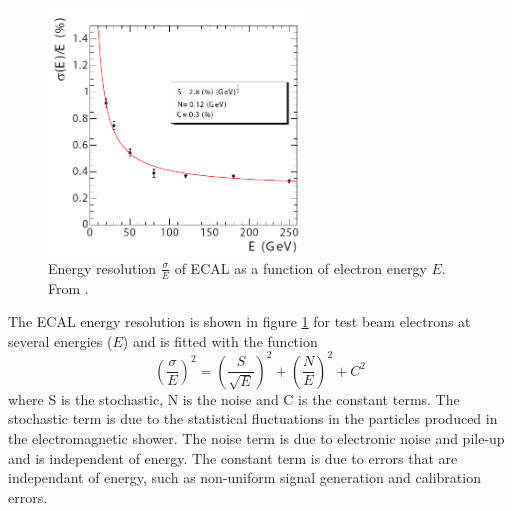 \begin{figure}[htb!]
  \centering
  \includegraphics[width=0.6\textwidth]{ECAL}
  \caption{Energy resolution $\frac{\sigma}{E}$ of ECAL as a function of
  \label{fig:ECAL}
electron energy $E$. From \cite{cms}.}
\end{figure}

The ECAL energy resolution is shown in figure \ref{fig:ECAL} for test beam
electrons at several energies ($E$) and is fitted with the function
\begin{equation}
\left(\frac{\sigma}{E}\right)^{2} = \left(\frac{S}{\sqrt{E}}\right)^{2} +
\left(\frac{N}{E}\right)^{2} + C^{2}
\end{equation}
where S is the stochastic, N is the noise and C is the constant terms. The
stochastic term is due to the statistical fluctuations in the particles
produced in the electromagnetic shower. The noise term is due to electronic
noise and pile-up and is independent of energy. The constant term is due to
errors that are independant of energy, such as non-uniform signal generation
and calibration errors.\cite{cms}




